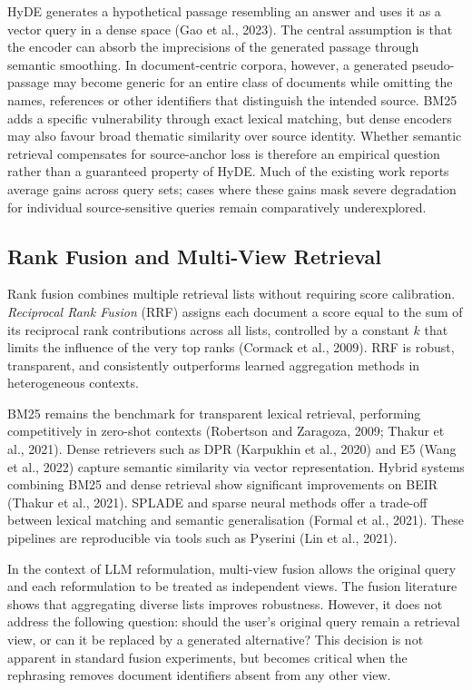 \documentclass[a4paper,fleqn]{cas-dc}
\begin{document}
HyDE generates a hypothetical passage resembling an answer and
uses it as a vector query in a dense space (Gao et al.,
2023). The central assumption is that the encoder can absorb the
imprecisions of the generated passage through semantic smoothing.
In document-centric corpora, however, a generated pseudo-passage
may become generic for an entire class of documents while omitting
the names, references or other identifiers that distinguish the
intended source. BM25 adds a specific vulnerability through exact
lexical matching, but dense encoders may also favour broad thematic
similarity over source identity. Whether semantic retrieval
compensates for source-anchor loss is therefore an empirical
question rather than a guaranteed property of HyDE. Much of the
existing work reports average gains across query sets; cases where
these gains mask severe degradation for individual source-sensitive
queries remain comparatively underexplored.

\subsection{Rank Fusion and Multi-View Retrieval}

Rank fusion combines multiple retrieval lists without
requiring score calibration. \textit{Reciprocal Rank
Fusion} (RRF) assigns each document a score equal to the sum of
its reciprocal rank contributions across all lists,
controlled by a constant $k$ that limits the influence of the very
top ranks (Cormack et al., 2009). RRF is robust, transparent,
and consistently outperforms learned aggregation methods in
heterogeneous contexts.

BM25 remains the benchmark for transparent lexical retrieval, performing competitively in
zero-shot contexts (Robertson and Zaragoza, 2009; Thakur et al., 2021). Dense
retrievers such as DPR (Karpukhin et al., 2020) and E5
(Wang et al., 2022) capture semantic similarity via
vector representation. Hybrid systems combining BM25 and
dense retrieval show significant improvements on BEIR
(Thakur et al., 2021). SPLADE and sparse neural methods
offer a trade-off between lexical matching and semantic generalisation
(Formal et al., 2021). These pipelines are reproducible
via tools such as Pyserini (Lin et al., 2021).

In the context of LLM reformulation, multi-view fusion allows
the original query and each reformulation to be treated as
independent views. The fusion literature shows that aggregating
diverse lists improves robustness. However, it does 
not address the following question: should the user’s original query
remain a retrieval view, or can it be replaced
by a generated alternative? This decision is not apparent in
standard fusion experiments, but becomes critical when the
rephrasing removes document identifiers absent from any
other view.
\end{document}
